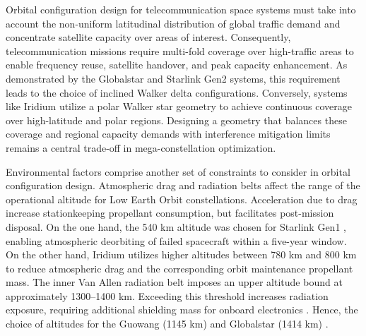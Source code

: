 Orbital configuration design for telecommunication space systems must take into account the non-uniform latitudinal distribution of global traffic demand and concentrate satellite capacity over areas of interest. Consequently, telecommunication missions require multi-fold coverage over high-traffic areas to enable frequency reuse, satellite handover, and peak capacity enhancement. As demonstrated by the Globalstar \cite{wiedeman1993globalstar} and Starlink Gen2 \cite{ali2026starlink} systems, this requirement leads to the choice of inclined Walker delta configurations. Conversely, systems like Iridium \cite{fossa1998overview} utilize a polar Walker star geometry to achieve continuous coverage over high-latitude and polar regions. Designing a geometry that balances these coverage  and regional capacity demands with interference mitigation limits remains a central trade-off in mega-constellation optimization.

Environmental factors comprise another set of constraints to consider in orbital configuration design. Atmospheric drag and radiation belts affect the range of the operational altitude for Low Earth Orbit constellations. Acceleration due to drag increase stationkeeping propellant consumption, but facilitates post-mission disposal. On the one hand, the 540 km altitude was chosen for Starlink Gen1 \cite{ali2026starlink}, enabling atmospheric deorbiting of failed spacecraft within a five-year window. On the  other hand, Iridium \cite{fossa1998overview} utilizes higher altitudes between 780 km and 800 km to reduce atmospheric drag and the corresponding orbit maintenance propellant mass. The inner Van Allen radiation belt imposes an upper altitude bound  at approximately 1300–1400 km. Exceeding this threshold increases radiation exposure, requiring additional shielding mass for onboard electronics \cite{wertz2001ocdm}. Hence, the choice of altitudes for the Guowang (1145 km) \cite{???} and Globalstar (1414 km) \cite{wiedeman1993globalstar}.

